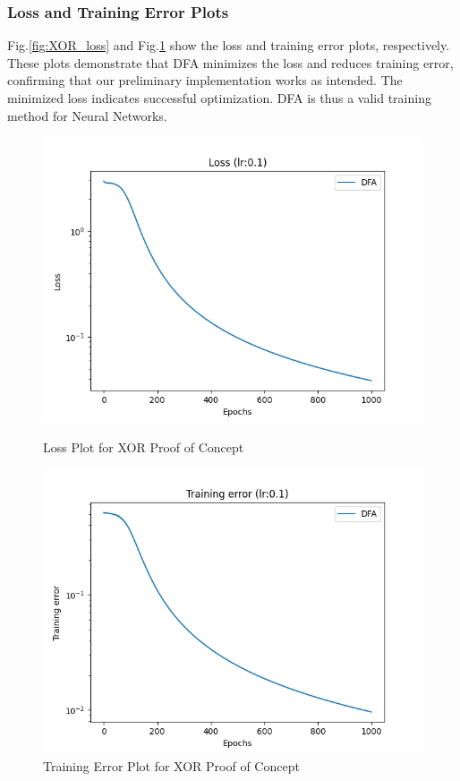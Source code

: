 \documentclass[english]{article}
\begin{document}
\subsubsection*{Loss and Training Error Plots}
Fig.\ref{fig:XOR_loss} and Fig.\ref{fig:XOR_te} show the loss and training error plots, respectively. These plots demonstrate that DFA minimizes the loss and reduces training error, confirming that our preliminary implementation works as intended. The minimized loss indicates successful optimization. DFA is thus a valid training method for Neural Networks.
\begin{figure}[H]
    \centering
    \begin{minipage}{0.48\textwidth}
        \includegraphics[width=\linewidth]{rsc/XOR/XOR_proofofconcept_LOSS.png}
        \caption{Loss Plot for XOR Proof of Concept}\label{fig:XOR_loss}
    \end{minipage}%
    \hfill
    \begin{minipage}{0.48\textwidth}
        \includegraphics[width=\linewidth]{rsc/XOR/XOR_proofofconcept_TE.png}
        \caption{Training Error Plot for XOR Proof of Concept}\label{fig:XOR_te}
    \end{minipage}%
\end{figure}
\end{document}
